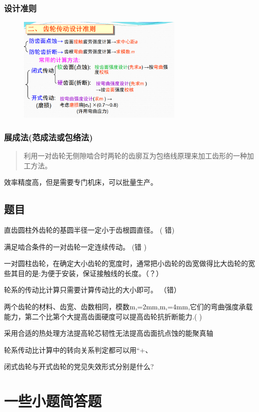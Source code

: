 \documentclass[twocolumn]{ctexart}
\begin{document}
\subsubsection{设计准则}
        \begin{figure}[H]
            \centering
            \includegraphics[width=8cm]{img/5.png}
            \end{figure}
\subsubsection{展成法(范成法或包络法)}
\begin{quote}
{\qquad{}\ccwd\kaishu{}
利用一对齿轮无侧隙啮合时两轮的齿廓互为包络线原理来加工齿形的一种加工方法。
}
\end{quote}
效率精度高，但是需要专门机床，可以批量生产。
\subsection{题目}
直齿圆柱外齿轮的基圆半径一定小于齿根圆直径。 ( 错)

满足啮合条件的一对齿轮一定连续传动。 (错 )

一对圆柱齿轮，在确定大小齿轮的宽度时，通常把小齿轮的齿宽做得比大齿轮的宽些其目的是:为便于安装，保证接触线的长度。（？）


轮系的传动比计算只需要计算传动比的大小即可。 （错）

两个齿轮的材料、齿宽、齿数相同，模数m,=2mm,m,=4mm,它们的弯曲强度承载能力，第二个比第个大提高齿面硬度可以提高齿轮抗折断能力.( )

采用合适的热处理方法提高轮芯韧性无法提高齿面抗点蚀的能聚真轴

轮系传动比计算中的转向关系判定都可以用“+、

闭式齿轮与开式齿轮的党见失效形式分别是什么?
\section{一些小题简答题}
\end{document}
